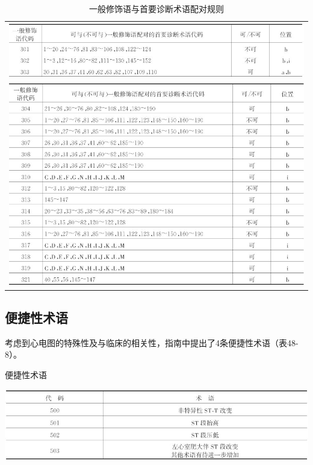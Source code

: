 \begin{longtable}{c}
  \caption{一般修饰语与首要诊断术语配对规则}
  \label{tab48-7}\\
  \endfirsthead
  \caption[]{一般修饰语与首要诊断术语配对规则}
  \endhead
\includegraphics[width=\textwidth,height=\textheight,keepaspectratio]{./images/Image00756.jpg}\\
\includegraphics[width=\textwidth,height=\textheight,keepaspectratio]{./images/Image00757.jpg}
\end{longtable}

\protect\hypertarget{text00057.htmlux5cux23subid709}{}{}

\subsection{便捷性术语}

考虑到心电图的特殊性及与临床的相关性，指南中提出了4条便捷性术语（表48-8）。

\begin{table}[htbp]
\centering
\caption{便捷性术语}
\label{tab48-8}
\includegraphics[width=5.4375in,height=1.23958in]{./images/Image00758.jpg}
\end{table}

